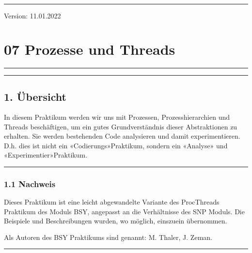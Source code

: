\documentclass[a4paper,10pt,english]{report}
\begin{document}
\bigskip\hrule\bigskip


\sphinxAtStartPar
Version: 11.01.2022


\chapter{07 \sphinxhyphen{} Prozesse und Threads}
\label{\detokenize{P07_Prozesse_und_Threads/README:prozesse-und-threads}}\label{\detokenize{P07_Prozesse_und_Threads/README::doc}}

\bigskip\hrule\bigskip


\sphinxAtStartPar
{}

\sphinxAtStartPar
{}


\bigskip\hrule\bigskip



\section{1. Übersicht}
\label{\detokenize{P07_Prozesse_und_Threads/README:ubersicht}}
\sphinxAtStartPar
In diesem Praktikum werden wir uns mit Prozessen, Prozesshierarchien und Threads beschäftigen, um ein gutes Grundverständnis dieser Abstraktionen zu erhalten. Sie werden bestehenden Code analysieren und damit experimentieren. D.h. dies ist nicht ein «Codierungs»\sphinxhyphen{}Praktikum, sondern ein «Analyse»\sphinxhyphen{} und «Experimentier»\sphinxhyphen{}Praktikum.


\bigskip\hrule\bigskip



\subsection{1.1 Nachweis}
\label{\detokenize{P07_Prozesse_und_Threads/README:nachweis}}
\sphinxAtStartPar
Dieses Praktikum ist eine leicht abgewandelte Variante des ProcThreads Praktikum des Moduls BSY, angepasst an die Verhältnisse des SNP Moduls. Die Beispiele und Beschreibungen wurden, wo möglich, eins\sphinxhyphen{}zu\sphinxhyphen{}ein übernommen.

\sphinxAtStartPar
Als Autoren des BSY Praktikums sind genannt: M. Thaler, J. Zeman.


\bigskip\hrule\bigskip
\end{document}
